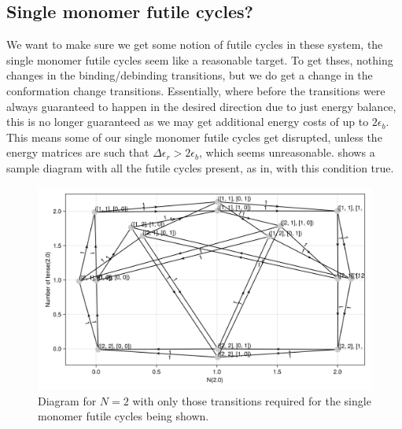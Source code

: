 \documentclass[11pt]{article}
\begin{document}
\subsection{Single monomer futile cycles?}
We want to make sure we get some notion of futile cycles in these system, the single monomer futile cycles seem like a reasonable target.
To get thses, nothing changes in the binding/debinding transitions, but we do get a change in the conformation change transitions.
Essentially, where before the transitions were always guaranteed to happen in the desired direction due to just energy balance, this is no longer guaranteed as we may get additional energy costs of up to $2\epsilon_b$.
This means some of our single monomer futile cycles get disrupted, unless the energy matrices are such that $\Delta\epsilon_r > 2\epsilon_b$, which seems unreasonable.
 shows a sample diagram with all the futile cycles present, as in, with this condition true.

\begin{figure}[H]
    \includegraphics[width=\textwidth]{../../plots/fcs_B=1_C=2_N=2_version=2.5.png}
    \caption{
        Diagram for $N=2$ with only those transitions required for the single monomer futile cycles being shown.
    }\label{fig:N2fcs}
\end{figure}


\newpage
\end{document}
